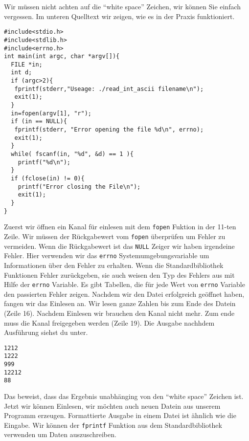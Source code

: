 Wir müssen nicht achten auf die ``white space'' Zeichen, wir können Sie einfach vergessen.
Im unteren Quelltext wir zeigen, wie es in der Praxis funktioniert.
\begin{lstlisting}
#include<stdio.h>
#include<stdlib.h>
#include<errno.h>
int main(int argc, char *argv[]){
  FILE *in;
  int d;
  if (argc>2){
   fprintf(stderr,"Useage: ./read_int_ascii filename\n");
   exit(1);
  }
  in=fopen(argv[1], "r");
  if (in == NULL){
   fprintf(stderr, "Error opening the file %d\n", errno);
   exit(1);
  }
  while( fscanf(in, "%d", &d) == 1 ){
    printf("%d\n");
  }
  if (fclose(in) != 0){
    printf("Error closing the File\n");
    exit(1);
  }
}
\end{lstlisting}
Zuerst wir öffnen ein Kanal für einlesen mit dem \texttt{fopen} Fuktion in der 11-ten Zeile. Wir müssen 
der Rückgabewert vom \texttt{fopen} überprüfen um Fehler zu vermeiden. Wenn die Rückgabewert ist das 
\texttt{NULL} Zeiger wir haben irgendeine Fehler. Hier verwenden wir das \texttt{errno} Systemumgebungsvariable
um Informationen über den Fehler zu erhalten. Wenn die Standardbibliothek Funktionen Fehler zurückgeben, sie auch 
weisen den Typ des Fehlers aus mit Hilfe der \texttt{errno} Variable. Es gibt Tabellen, die für jede Wert von 
\texttt{errno} Variable den passierten Fehler zeigen. Nachdem wir den Datei erfolgreich geöffnet haben, fangen wir 
das Einlesen an. Wir lesen ganze Zahlen bis zum Ende des Datein (Zeile 16). Nachdem Einlesen wir brauchen den Kanal 
nicht mehr. Zum ende muss die Kanal freigegeben werden (Zeile 19). Die Ausgabe nachhdem Ausführung siehst du unter.
\begin{lstlisting}
1212
1222
999
12212
88
\end{lstlisting}
Das beweist, dass das Ergebnis unabhänging von den ``white space'' Zeichen ist. Jetzt wir können Einlesen, 
wir möchten auch neuen Datein aus unserem Programm erzeugen. Formattierte Ausgabe in einem Datei ist ähnlich 
wie die Eingabe. Wir können der \texttt{fprintf} Funktion aus dem Standardbibliothek verwenden um Daten 
auszuschreiben.
